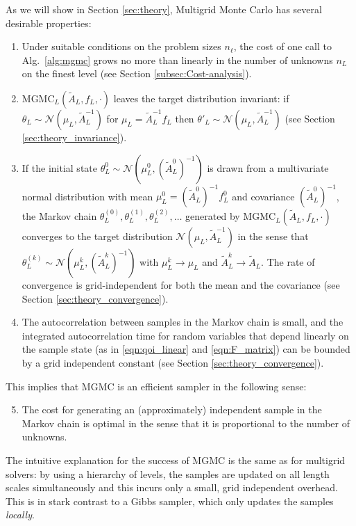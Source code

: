 \documentclass[11pt,english]{article}
\theoremstyle{plain}
\theoremstyle{plain}
\theoremstyle{plain}
\theoremstyle{plain}
\numberwithin{equation}{section}
\begin{document}
As we will show in Section \ref{sec:theory}, Multigrid Monte Carlo has several desirable properties:
\begin{enumerate}
    \item Under suitable conditions on the problem sizes $n_\ell$, the cost of one call to Alg.~\ref{alg:mgmc} grows no more than linearly in the number of unknowns $n_L$ on the finest level (see Section \ref{subsec:Cost-analysis}).
    \item $\textrm{MGMC}_L(\widetilde{A}_L,f_L,\cdot)$ leaves the target distribution invariant: if $\theta_L \sim \mathcal{N}(\mu_L,\widetilde{A}_{L}^{-1})$ for $\mu_L=\widetilde{A}_L^{-1}f_L$ then $\theta'_L \sim \mathcal{N}(\mu_L,\widetilde{A}_{L}^{-1})$ (see Section \ref{sec:theory_invariance}).
    \item If the initial state $\theta_{L}^{0}\sim \mathcal{N}(\mu_L^0,(\widetilde{A}_{L}^0)^{-1})$ is drawn from a multivariate normal distribution with mean $\mu_L^0 = (\widetilde{A}_L^{0})^{-1}f_L^0$ and covariance $(\widetilde{A}_{L}^0)^{-1}$, the Markov chain $\theta_{L}^{(0)},\theta_{L}^{(1)},\theta_{L}^{(2)},\dots$ generated by $\textrm{MGMC}_L(\widetilde{A}_L,f_L,\cdot)$ converges to the target distribution $\mathcal{N}(\mu_L,\widetilde{A}_L^{-1})$ in the sense that $\theta_{L}^{(k)}\sim \mathcal{N}(\mu_L^k,(\widetilde{A}_{L}^k)^{-1})$ with $\mu_L^k\rightarrow \mu_L$ and $\widetilde{A}_L^k\rightarrow \widetilde{A}_L$. The rate of convergence is grid-independent for both the mean and the covariance (see Section \ref{sec:theory_convergence}).
    \item The autocorrelation between samples in the Markov chain is small, and the integrated autocorrelation time for random variables that depend linearly on the sample state (as in \eqref{eqn:qoi_linear} and \eqref{eqn:F_matrix}) can be bounded by a grid independent constant (see Section \ref{sec:theory_convergence}).
\end{enumerate}
This implies that MGMC is an efficient sampler in the following sense:
\begin{enumerate}
    \setcounter{enumi}{4}
    \item The cost for generating an (approximately) independent sample in the Markov chain is optimal in the sense that it is proportional to the number of unknowns.
\end{enumerate}
The intuitive explanation for the success of MGMC is the same as for multigrid solvers: by using a hierarchy of levels, the samples are updated on all length scales simultaneously and this incurs only a small, grid independent overhead. This is in stark contrast to a Gibbs sampler, which only updates the samples \textit{locally}.
\end{document}
